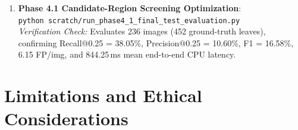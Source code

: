 \documentclass[pdflatex,sn-mathphys-num]{sn-jnl}
\theoremstyle{thmstyleone}%
\theoremstyle{thmstyletwo}%
\theoremstyle{thmstylethree}%
\begin{document}
\begin{enumerate}
        \textit{Verification Check:} Evaluates 236 natural-background test images, confirming 38.98\% Top-1 accuracy, 36.84\% Macro-F1, and selective prediction (93.22\% coverage, 40.91\% selective accuracy at threshold 0.2231).
  \item \textbf{Phase 4.1 Candidate-Region Screening Optimization}:\\
        \texttt{python scratch/run\_phase4\_1\_final\_test\_evaluation.py}\\
        \textit{Verification Check:} Evaluates 236 images (452 ground-truth leaves), confirming Recall@0.25 = 38.05\%, Precision@0.25 = 10.60\%, F1 = 16.58\%, 6.15 FP/img, and 844.25\,ms mean end-to-end CPU latency.
\end{enumerate}


\section*{Limitations and Ethical Considerations}
\end{document}
